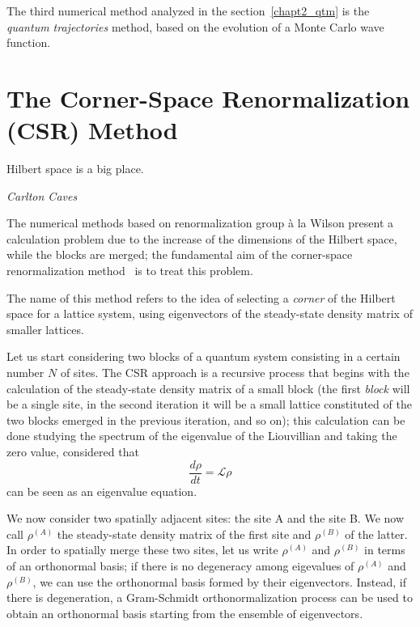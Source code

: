 The third numerical method analyzed in the section~\ref{chapt2_qtm} is the \emph{quantum trajectories} method, based on the evolution of a Monte Carlo wave function.

\section{The Corner-Space Renormalization (CSR) Method}
\label{chapter2_csr}
\epigraph{Hilbert space is a big place.}{\textit{Carlton Caves}}
The numerical methods based on renormalization group à la Wilson present a calculation problem due to the increase of the dimensions of the Hilbert space, while the blocks are merged; the fundamental aim of the corner-space renormalization method~\cite{PhysRevLett.115.080604} is to treat this problem.

The name of this method refers to the idea of selecting a \emph{corner} of the Hilbert space for a lattice system, using eigenvectors of the steady-state density matrix of smaller lattices.

Let us start considering two blocks of a quantum system consisting in a certain number $N$ of sites. The CSR approach is a recursive process that begins with the calculation of the steady-state density matrix of a small block (the first \emph{block} will be a single site, in the second iteration it will be a small lattice constituted of the two blocks emerged in the previous iteration, and so on); this calculation can be done studying the spectrum of the eigenvalue of the Liouvillian and taking the zero value, considered that
\begin{equation}
    \frac{d\rho}{dt} = \mathcal{L} \rho
\end{equation}
can be seen as an eigenvalue equation.

We now consider two spatially adjacent sites: the site A and the site B. We now call $\rho^{(A)}$ the steady-state density matrix of the first site and $\rho^{(B)}$ of the latter. In order to spatially merge these two sites, let us write $\rho^{(A)}$ and $\rho^{(B)}$ in terms of an orthonormal basis; if there is no degeneracy among eigevalues of $\rho^{(A)}$ and $\rho^{(B)}$, we can use the orthonormal basis formed by their eigenvectors. Instead, if there is degeneration, a Gram-Schmidt orthonormalization process can be used to obtain an orthonormal basis starting from the ensemble of eigenvectors.

